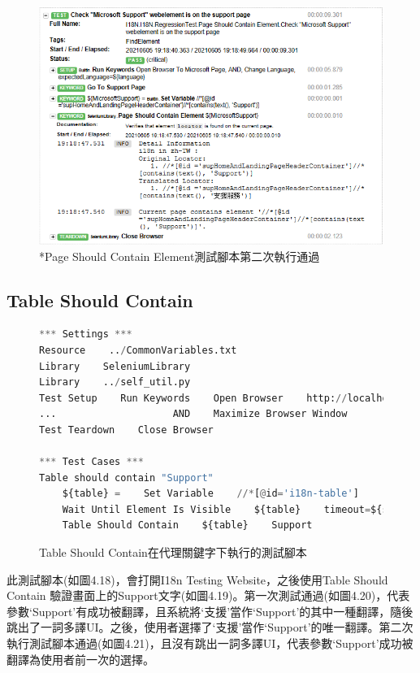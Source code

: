 \begin{figure}[H]
\includegraphics[width= \textwidth]{../論文截圖/4.1.5-3 page should contain element 2nd run.png}
\caption{*Page Should Contain Element測試腳本第二次執行通過}
\end{figure}

\subsection{Table Should Contain}
\begin{figure}[H]
\begin{lstlisting}[language={python}]
*** Settings ***
Resource    ../CommonVariables.txt
Library    SeleniumLibrary
Library    ../self_util.py
Test Setup    Run Keywords    Open Browser    http://localhost:3000    Chrome
...                    AND    Maximize Browser Window
Test Teardown    Close Browser

*** Test Cases ***
Table should contain "Support"
    ${table} =    Set Variable    //*[@id='i18n-table']
    Wait Until Element Is Visible    ${table}    timeout=${shortPeriodOfTime}
    Table Should Contain    ${table}    Support
\end{lstlisting}
\caption{Table Should Contain在代理關鍵字下執行的測試腳本}
\end{figure}
此測試腳本(如圖4.18)，會打開I18n Testing Website，之後使用Table Should Contain 驗證畫面上的Support文字(如圖4.19)。第一次測試通過(如圖4.20)，代表參數‘Support’有成功被翻譯，且系統將‘支援’當作‘Support’的其中一種翻譯，隨後跳出了一詞多譯UI。之後，使用者選擇了‘支援’當作‘Support’的唯一翻譯。第二次執行測試腳本通過(如圖4.21)，且沒有跳出一詞多譯UI，代表參數‘Support’成功被翻譯為使用者前一次的選擇。

